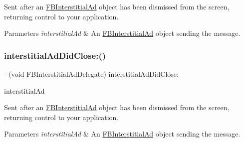 Sent after an \hyperlink{interfaceFBInterstitialAd}{F\+B\+Interstitial\+Ad} object has been dismissed from the screen, returning control to your application.


\begin{DoxyParams}{Parameters}
{\em interstitial\+Ad} & An \hyperlink{interfaceFBInterstitialAd}{F\+B\+Interstitial\+Ad} object sending the message. \\
\hline
\end{DoxyParams}
\mbox{\label{protocolFBInterstitialAdDelegate_01-p_a764df2f13294f6db329aad7e96b99da1}} 
\subsubsection{\texorpdfstring{interstitial\+Ad\+Did\+Close\+:()}{interstitialAdDidClose:()}\hspace{0.1cm}{\footnotesize\ttfamily [2/5]}}
{\footnotesize\ttfamily -\/ (void F\+B\+Interstitial\+Ad\+Delegate) interstitial\+Ad\+Did\+Close\+: \begin{DoxyParamCaption}\item[{(\hyperlink{interfaceFBInterstitialAd}{F\+B\+Interstitial\+Ad} $\ast$)}]{interstitial\+Ad }\end{DoxyParamCaption}\hspace{0.3cm}{\ttfamily [optional]}}

Sent after an \hyperlink{interfaceFBInterstitialAd}{F\+B\+Interstitial\+Ad} object has been dismissed from the screen, returning control to your application.


\begin{DoxyParams}{Parameters}
{\em interstitial\+Ad} & An \hyperlink{interfaceFBInterstitialAd}{F\+B\+Interstitial\+Ad} object sending the message. \\
\hline
\end{DoxyParams}
\mbox{\label{protocolFBInterstitialAdDelegate_01-p_a764df2f13294f6db329aad7e96b99da1}} 

